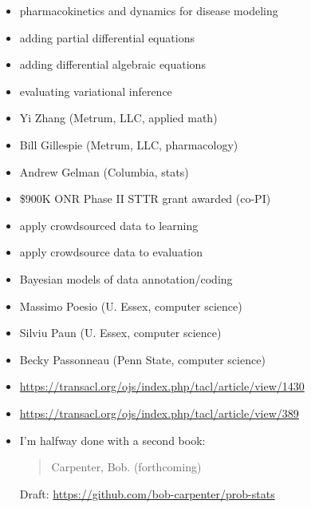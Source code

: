\documentclass[10pt]{report}
\begin{document}
\begin{itemize}
\item pharmacokinetics and dynamics for disease modeling
\item adding partial differential equations
\item adding differential algebraic equations
\item evaluating variational inference
\item Yi Zhang (Metrum, LLC, applied math)
\item Bill Gillespie (Metrum, LLC, pharmacology)
\item Andrew Gelman (Columbia, stats)
\vfill
\item {\footnotesize \$900K ONR Phase II STTR grant awarded (co-PI)}
\end{itemize}

\begin{itemize}
\item apply crowdsourced data to learning
\item apply crowdsource data to evaluation
\item Bayesian models of data annotation/coding
\item Massimo Poesio (U. Essex, computer science)
\item Silviu Paun (U. Essex, computer science)
\item Becky Passonneau (Penn State, computer science)
\vfill
\item \footnotesize \url{https://transacl.org/ojs/index.php/tacl/article/view/1430}
\item \footnotesize \url{https://transacl.org/ojs/index.php/tacl/article/view/389}
\end{itemize}

\begin{itemize}
\item I'm halfway done with a second book:
\begin{quote}
Carpenter, Bob. (forthcoming) 
\end{quote}
\vfill
\noindent
{\footnotesize Draft: \url{https://github.com/bob-carpenter/prob-stats}}
\end{itemize}
\end{document}
